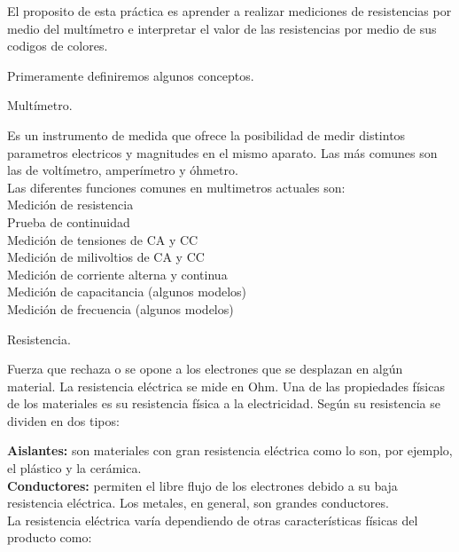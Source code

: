 \documentclass[11pt,a4paper]{report}
\begin{document}
\begin{flushleft}
	
	El proposito de esta pr\'actica es aprender a realizar mediciones de resistencias por medio del mult\'imetro e interpretar el valor de las resistencias por medio de sus codigos de colores.\\
	\vspace*{0.5cm}
	
	Primeramente definiremos algunos conceptos.\\
	\vspace*{0.5cm}
	\begin{Large}
		Mult\'imetro.\\
	\end{Large}
	Es un instrumento de medida que ofrece la posibilidad de medir distintos parametros electricos y magnitudes en el mismo aparato. Las más comunes son las de voltímetro, amperímetro y óhmetro.\\
	\vspace*{0.5cm}
	Las diferentes funciones comunes en multimetros actuales son:\\
	Medición de resistencia\\
	Prueba de continuidad\\
	Medición de tensiones de CA y CC\\
	Medición de milivoltios de CA y CC\\
	Medición de corriente alterna y continua\\
	Medición de capacitancia (algunos modelos)\\
	Medición de frecuencia (algunos modelos)\\
	\vspace*{0.5cm}
	
	\begin{Large}
		Resistencia.\\
	\end{Large}
	
	Fuerza que rechaza o se opone a los electrones que se desplazan en algún material. La resistencia eléctrica se mide en Ohm. Una de las propiedades físicas de los materiales es su resistencia física a la electricidad. Según su resistencia se dividen en dos tipos:\\
	\vspace*{0.5cm}
	
	\textbf{Aislantes:} son materiales con gran resistencia eléctrica como lo son, por	 \vspace*{0.5cm} ejemplo, el plástico y la cerámica.\\ 	
	\vspace*{0.5cm}
	\textbf{Conductores:} permiten el libre flujo de los electrones debido a su baja resistencia eléctrica. Los metales, en general, son grandes conductores.\\
	\vspace*{0.5cm}
	La resistencia eléctrica varía dependiendo de otras características físicas del producto como:\\
	

\end{flushleft}
\end{document}
